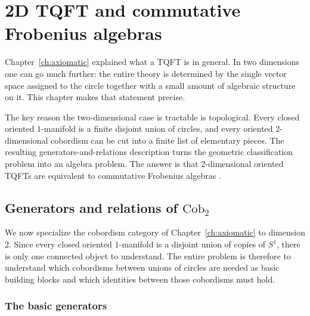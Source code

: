 \chapter{2D TQFT and commutative Frobenius algebras}\label{ch:frobenius}

Chapter~\ref{ch:axiomatic} explained what a TQFT is in general. In two dimensions one can go much further: the entire theory is determined by the single vector space assigned to the circle together with a small amount of algebraic structure on it. This chapter makes that statement precise.

\medskip

\noindent The key reason the two-dimensional case is tractable is topological. Every closed oriented $1$-manifold is a finite disjoint union of circles, and every oriented $2$-dimensional cobordism can be cut into a finite list of elementary pieces. The resulting generators-and-relations description turns the geometric classification problem into an algebra problem. The answer is that 2-dimensional oriented TQFTs are equivalent to commutative Frobenius algebras \cite{Kock2004Frobenius}.

\section{Generators and relations of \texorpdfstring{$\mathrm{Cob}_2$}{Cob2}}\label{sec:cob2-generators}

We now specialize the cobordism category of Chapter~\ref{ch:axiomatic} to dimension $2$. Since every closed oriented $1$-manifold is a disjoint union of copies of $S^1$, there is only one connected object to understand. The entire problem is therefore to understand which cobordisms between unions of circles are needed as basic building blocks and which identities between those cobordisms must hold.

\subsection{The basic generators}

